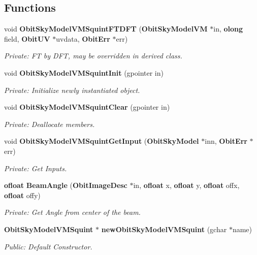 \subsection*{Functions}
\begin{CompactItemize}
\item 
void {\bf Obit\-Sky\-Model\-VMSquint\-FTDFT} ({\bf Obit\-Sky\-Model\-VM} $\ast$in, {\bf olong} field, {\bf Obit\-UV} $\ast$uvdata, {\bf Obit\-Err} $\ast$err)
\begin{CompactList}\small\item\em Private: FT by DFT, may be overridden in derived class. \item\end{CompactList}\item 
void {\bf Obit\-Sky\-Model\-VMSquint\-Init} (gpointer in)
\begin{CompactList}\small\item\em Private: Initialize newly instantiated object. \item\end{CompactList}\item 
void {\bf Obit\-Sky\-Model\-VMSquint\-Clear} (gpointer in)
\begin{CompactList}\small\item\em Private: Deallocate members. \item\end{CompactList}\item 
void {\bf Obit\-Sky\-Model\-VMSquint\-Get\-Input} ({\bf Obit\-Sky\-Model} $\ast$inn, {\bf Obit\-Err} $\ast$err)
\begin{CompactList}\small\item\em Private: Get Inputs. \item\end{CompactList}\item 
{\bf ofloat} {\bf Beam\-Angle} ({\bf Obit\-Image\-Desc} $\ast$in, {\bf ofloat} x, {\bf ofloat} y, {\bf ofloat} offx, {\bf ofloat} offy)
\begin{CompactList}\small\item\em Private: Get Angle from center of the beam. \item\end{CompactList}\item 
{\bf Obit\-Sky\-Model\-VMSquint} $\ast$ {\bf new\-Obit\-Sky\-Model\-VMSquint} (gchar $\ast$name)
\begin{CompactList}\small\item\em Public: Default Constructor. \item\end{CompactList}\item 

\end{CompactItemize}
